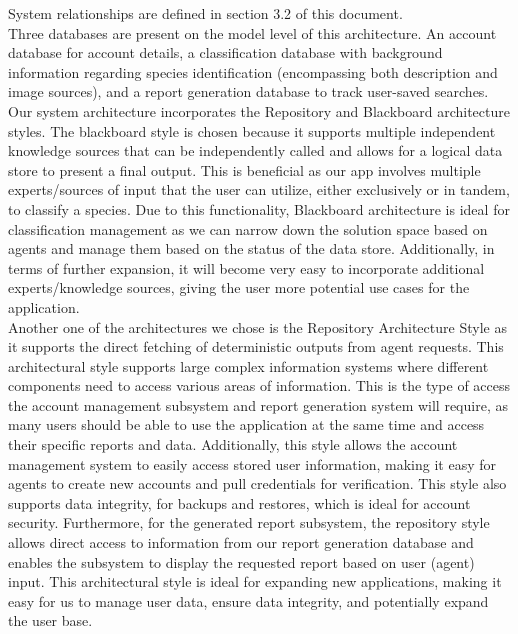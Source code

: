 \documentclass[]{article}
\begin{document}
System relationships are defined in section 3.2 of this document. 
\\

Three databases are present on the model level of this architecture. An account database for account details, a classification database with background information regarding species identification (encompassing both description and image sources), and a report generation database to track user-saved searches. 
\\

Our system architecture incorporates the Repository and Blackboard architecture styles. The blackboard style is chosen because it supports multiple independent knowledge sources that can be independently called and allows for a logical data store to present a final output. This is beneficial as our app involves multiple experts/sources of input that the user can utilize, either exclusively or in tandem, to classify a species. Due to this functionality, Blackboard architecture is ideal for classification management as we can narrow down the solution space based on agents and manage them based on the status of the data store. Additionally, in terms of further expansion, it will become very easy to incorporate additional experts/knowledge sources, giving the user more potential use cases for the application.
\\

Another one of the architectures we chose is the Repository Architecture Style as it supports the direct fetching of deterministic outputs from agent requests. This architectural style supports large complex information systems where different components need to access various areas of information. This is the type of access the account management subsystem and report generation system will require, as many users should be able to use the application at the same time and access their specific reports and data. Additionally, this style allows the account management system to easily access stored user information, making it easy for agents to create new accounts and pull credentials for verification. This style also supports data integrity, for backups and restores, which is ideal for account security. Furthermore, for the generated report subsystem, the repository style allows direct access to information from our report generation database and enables the subsystem to display the requested report based on user (agent) input. This architectural style is ideal for expanding new applications, making it easy for us to manage user data, ensure data integrity, and potentially expand the user base.
\\
\end{document}
